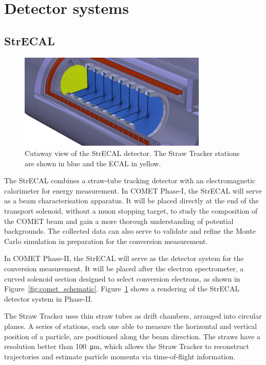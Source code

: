\section{Detector systems}
\subsection{StrECAL}


\begin{figure}
    \centering
    \includegraphics[width=0.8\textwidth]{chapter2/strecal_recolor.png}
    \caption{ Cutaway view of the StrECAL detector. The Straw Tracker stations
    are shown in blue and the ECAL in yellow.  }
    \label{fig:strecal}
\end{figure}

The StrECAL combines a straw-tube tracking detector with an electromagnetic
calorimeter for energy measurement. In COMET Phase-I, the StrECAL will serve as
a beam characterisation apparatus. It will be placed directly at the end of the
transport solenoid, without a muon stopping target, to study the composition of
the COMET beam and gain a more thorough understanding of potential backgrounds.
The collected data can also serve to validate and refine the Monte Carlo
simulation in preparation for the conversion measurement.

In COMET Phase-II, the StrECAL will serve as the detector system for the
conversion measurement. It will be placed after the electron spectrometer, a
curved solenoid section designed to select conversion electrons, as shown in
Figure~\ref{fig:comet_schematic}. Figure~\ref{fig:strecal} shows a rendering of
the StrECAL detector system in Phase-II.

The Straw Tracker uses thin straw tubes as drift chambers, arranged into
circular planes. A series of stations, each one able to measure the horizontal
and vertical position of a particle, are positioned along the beam direction.
The straws have a resolution better than \SI{100}{\um}, which allows the Straw
Tracker to reconstruct trajectories and estimate particle momenta via
time-of-flight information.

